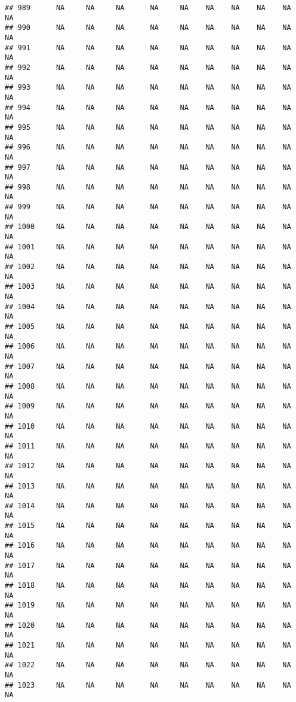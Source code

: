 \documentclass{article}\usepackage{graphicx, color}
\makeatletter
\newenvironment{kframe}{%
 \def\at@end@of@kframe{}%
 \ifinner\ifhmode%
  \def\at@end@of@kframe{\end{minipage}}%
  \begin{minipage}{\columnwidth}%
 \fi\fi%
 \def\FrameCommand##1{\hskip\@totalleftmargin \hskip-\fboxsep
 \colorbox{shadecolor}{##1}\hskip-\fboxsep
     \hskip-\linewidth \hskip-\@totalleftmargin \hskip\columnwidth}%
 \MakeFramed {\advance\hsize-\width
   \@totalleftmargin\z@ \linewidth\hsize
   \@setminipage}}%
 {\par\unskip\endMakeFramed%
 \at@end@of@kframe}
\newenvironment{knitrout}{}{} %
\makeatother
\begin{document}
\begin{knitrout}
\begin{kframe}
\begin{verbatim}
## 989      NA     NA     NA      NA     NA    NA    NA    NA    NA     NA
## 990      NA     NA     NA      NA     NA    NA    NA    NA    NA     NA
## 991      NA     NA     NA      NA     NA    NA    NA    NA    NA     NA
## 992      NA     NA     NA      NA     NA    NA    NA    NA    NA     NA
## 993      NA     NA     NA      NA     NA    NA    NA    NA    NA     NA
## 994      NA     NA     NA      NA     NA    NA    NA    NA    NA     NA
## 995      NA     NA     NA      NA     NA    NA    NA    NA    NA     NA
## 996      NA     NA     NA      NA     NA    NA    NA    NA    NA     NA
## 997      NA     NA     NA      NA     NA    NA    NA    NA    NA     NA
## 998      NA     NA     NA      NA     NA    NA    NA    NA    NA     NA
## 999      NA     NA     NA      NA     NA    NA    NA    NA    NA     NA
## 1000     NA     NA     NA      NA     NA    NA    NA    NA    NA     NA
## 1001     NA     NA     NA      NA     NA    NA    NA    NA    NA     NA
## 1002     NA     NA     NA      NA     NA    NA    NA    NA    NA     NA
## 1003     NA     NA     NA      NA     NA    NA    NA    NA    NA     NA
## 1004     NA     NA     NA      NA     NA    NA    NA    NA    NA     NA
## 1005     NA     NA     NA      NA     NA    NA    NA    NA    NA     NA
## 1006     NA     NA     NA      NA     NA    NA    NA    NA    NA     NA
## 1007     NA     NA     NA      NA     NA    NA    NA    NA    NA     NA
## 1008     NA     NA     NA      NA     NA    NA    NA    NA    NA     NA
## 1009     NA     NA     NA      NA     NA    NA    NA    NA    NA     NA
## 1010     NA     NA     NA      NA     NA    NA    NA    NA    NA     NA
## 1011     NA     NA     NA      NA     NA    NA    NA    NA    NA     NA
## 1012     NA     NA     NA      NA     NA    NA    NA    NA    NA     NA
## 1013     NA     NA     NA      NA     NA    NA    NA    NA    NA     NA
## 1014     NA     NA     NA      NA     NA    NA    NA    NA    NA     NA
## 1015     NA     NA     NA      NA     NA    NA    NA    NA    NA     NA
## 1016     NA     NA     NA      NA     NA    NA    NA    NA    NA     NA
## 1017     NA     NA     NA      NA     NA    NA    NA    NA    NA     NA
## 1018     NA     NA     NA      NA     NA    NA    NA    NA    NA     NA
## 1019     NA     NA     NA      NA     NA    NA    NA    NA    NA     NA
## 1020     NA     NA     NA      NA     NA    NA    NA    NA    NA     NA
## 1021     NA     NA     NA      NA     NA    NA    NA    NA    NA     NA
## 1022     NA     NA     NA      NA     NA    NA    NA    NA    NA     NA
## 1023     NA     NA     NA      NA     NA    NA    NA    NA    NA     NA

\end{verbatim}
\end{kframe}
\end{knitrout}
\end{document}
